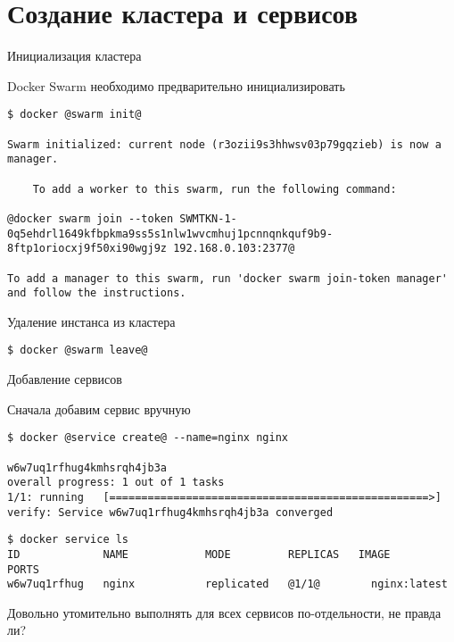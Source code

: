 \section{Создание кластера и сервисов}\label{sec:usage}

\begin{frame}[fragile]{Инициализация кластера}

Docker Swarm необходимо предварительно инициализировать

\begin{tcolorbox-code}
\begin{lstlisting}[style=base]
$ docker @swarm init@

Swarm initialized: current node (r3ozii9s3hhwsv03p79gqzieb) is now a manager.

    To add a worker to this swarm, run the following command:

@docker swarm join --token SWMTKN-1-0q5ehdrl1649kfbpkma9ss5s1nlw1wvcmhuj1pcnnqnkquf9b9-8ftp1oriocxj9f50xi90wgj9z 192.168.0.103:2377@

To add a manager to this swarm, run 'docker swarm join-token manager' and follow the instructions.
\end{lstlisting}
\end{tcolorbox-code}

Удаление инстанса из кластера

\begin{tcolorbox-code}
\begin{lstlisting}[style=base]
$ docker @swarm leave@
\end{lstlisting}
\end{tcolorbox-code}
\end{frame}



\begin{frame}[fragile]{Добавление сервисов}

Сначала добавим сервис вручную

\begin{tcolorbox-code}
\begin{lstlisting}[style=base]
$ docker @service create@ --name=nginx nginx

w6w7uq1rfhug4kmhsrqh4jb3a
overall progress: 1 out of 1 tasks 
1/1: running   [==================================================>] 
verify: Service w6w7uq1rfhug4kmhsrqh4jb3a converged
    \end{lstlisting}
\end{tcolorbox-code}

\begin{tcolorbox-code}
\begin{lstlisting}[style=base]
$ docker service ls
ID             NAME            MODE         REPLICAS   IMAGE          PORTS
w6w7uq1rfhug   nginx           replicated   @1/1@        nginx:latest   
\end{lstlisting}
\end{tcolorbox-code}

Довольно утомительно выполнять для всех сервисов по-отдельности, не правда ли?

\end{frame}


